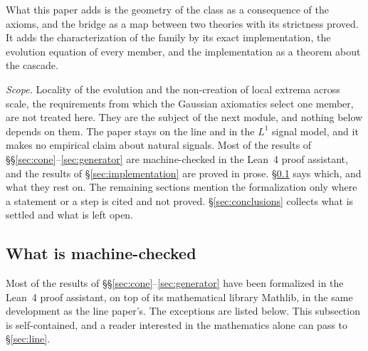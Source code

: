 What this paper adds is the geometry of the class as a consequence of the axioms, and the
bridge as a map between two theories with its strictness proved. It adds the
characterization of the \Matern{} family by its exact implementation, the evolution equation
of every member, and the implementation as a theorem about the cascade.

\emph{Scope.} Locality of the evolution and the non-creation of local extrema across scale,
the requirements from which the Gaussian axiomatics select one member, are not treated here.
They are the subject of the next module, and nothing below depends on them. The paper stays on
the line and in the $L^1$ signal model, and it makes no empirical claim about natural signals.
Most of the results of \S\S\ref{sec:cone}--\ref{sec:generator} are machine-checked in the
Lean~4 proof assistant, and the results of \S\ref{sec:implementation} are proved in prose.
\S\ref{sec:machine-checked} says which, and what they rest on. The remaining sections mention
the formalization only where a statement or a step is cited and not proved.
\S\ref{sec:conclusions} collects what is settled and what is left open.

\subsection{What is machine-checked}\label{sec:machine-checked}

Most of the results of \S\S\ref{sec:cone}--\ref{sec:generator} have been formalized in the
Lean~4 proof assistant, on top of its mathematical library Mathlib, in the same development as
the line paper's. The exceptions are listed below. This subsection is self-contained, and
a reader interested in the mathematics alone can pass to \S\ref{sec:line}.

